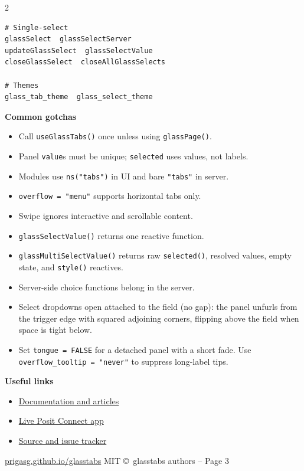\documentclass[9pt,a4paper]{article}
\newcommand{\code}[1]{\texttt{\footnotesize\color{codefg}#1}}
\newcommand{\gtfn}[1]{\texttt{\footnotesize\color{codekw}#1()}}
\newcommand{\gtarg}[1]{\texttt{\footnotesize\color{gtgreen}#1}}
\newcommand{\mysection}[1]{%
  \vspace{3pt}%
  \noindent\colorbox{sectionbg}{%
    \parbox{\dimexpr\linewidth-2\fboxsep\relax}{%
      \strut\textbf{\small\color{white}#1}\strut%
    }%
  }%
  \vspace{2pt}\par%
}
\begin{document}
\begin{multicols*}{2}
\begin{lstlisting}
# Single-select
glassSelect  glassSelectServer
updateGlassSelect  glassSelectValue
closeGlassSelect  closeAllGlassSelects

# Themes
glass_tab_theme  glass_select_theme
\end{lstlisting}

\columnbreak
\mysection{Common gotchas}

\begin{itemize}
  \item Call \gtfn{useGlassTabs} once unless using \gtfn{glassPage}.
  \item Panel \gtarg{value}s must be unique; \gtarg{selected} uses values, not labels.
  \item Modules use \code{ns("tabs")} in UI and bare \code{"tabs"} in server.
  \item \gtarg{overflow = "menu"} supports horizontal tabs only.
  \item Swipe ignores interactive and scrollable content.
  \item \gtfn{glassSelectValue} returns one reactive function.
  \item \gtfn{glassMultiSelectValue} returns raw \code{selected()}, resolved
        values, empty state, and \code{style()} reactives.
  \item Server-side choice functions belong in the server.
  \item Select dropdowns open attached to the field (no gap): the panel
        unfurls from the trigger edge with squared adjoining corners,
        flipping above the field when space is tight below.
  \item Set \gtarg{tongue = FALSE} for a detached panel with a short fade.
        Use \gtarg{overflow\_tooltip = "never"} to suppress long-label tips.
\end{itemize}

\mysection{Useful links}

\begin{itemize}
  \item \href{https://prigasg.github.io/glasstabs/}{Documentation and articles}
  \item \href{https://prigas89-glasstabs.share.connect.posit.cloud}{Live Posit Connect app}
  \item \href{https://github.com/PrigasG/glasstabs}{Source and issue tracker}
\end{itemize}

\vfill
{\tiny\color{gtgray}
\href{https://prigasg.github.io/glasstabs/}{prigasg.github.io/glasstabs}
\hfill MIT \copyright\ glasstabs authors -- Page 3}
\end{multicols*}
\end{document}
